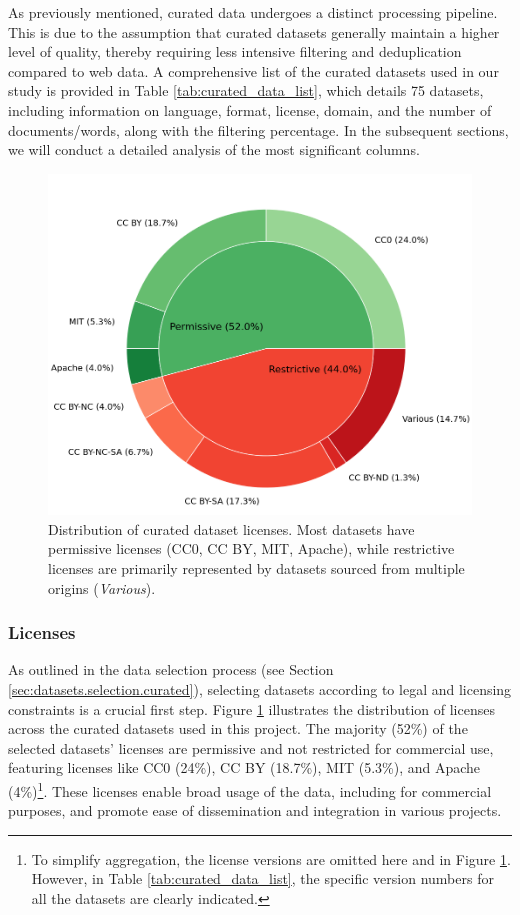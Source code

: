 
As previously mentioned, curated data undergoes a distinct processing pipeline. This is due to the assumption that curated datasets generally maintain a higher level of quality, thereby requiring less intensive filtering and deduplication compared to web data. A comprehensive list of the curated datasets used in our study is provided in Table \ref{tab:curated_data_list}, which details 75 datasets, including information on language, format, license, domain, and the number of documents/words, along with the filtering percentage. In the subsequent sections, we will conduct a detailed analysis of the most significant columns.



\begin{figure}
    \centering
    \includegraphics[width=0.6\linewidth]{images/Analysis/licenses.png}
    \caption{\label{fig:licenses}%
    Distribution of curated dataset licenses. Most datasets have permissive licenses (CC0, CC BY, MIT, Apache), 
    while restrictive licenses are primarily represented by datasets sourced from multiple origins (\textit{Various}). }
    
\end{figure}
\subsubsection{Licenses} 
As outlined in the data selection process (see Section \ref{sec:datasets.selection.curated}), selecting datasets according to legal and licensing constraints is a crucial first step. Figure \ref{fig:licenses} illustrates the distribution of licenses across the curated
datasets used in this project. The majority (52\%) of the selected datasets' licenses are permissive and not restricted for commercial use, featuring licenses like CC0 (24\%), CC BY (18.7\%), MIT (5.3\%), and Apache (4\%)\footnote{To simplify aggregation, the license versions are omitted here and in Figure \ref{fig:licenses}. However, in Table \ref{tab:curated_data_list}, the specific version numbers for all the datasets are clearly indicated.}. These licenses enable broad usage of the data, including for commercial purposes, and promote ease of dissemination and integration in various projects.

